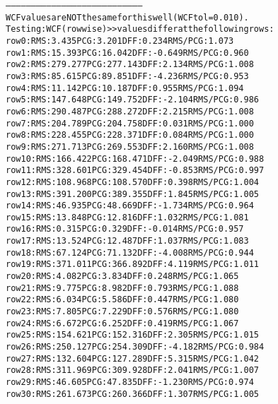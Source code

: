 \begin{alltt}
--------------------------------------------------------------------------------
WCF values are NOT the same for this well (WCF tol = 0.010).
Testing: WCF (rowwise) >> values differ at the following rows:
row   0:  RMS:   3.435    PCG:   3.201    DFF:   0.234    RMS/PCG:   1.073    
row   1:  RMS:  15.393    PCG:  16.042    DFF:  -0.649    RMS/PCG:   0.960    
row   2:  RMS: 279.277    PCG: 277.143    DFF:   2.134    RMS/PCG:   1.008    
row   3:  RMS:  85.615    PCG:  89.851    DFF:  -4.236    RMS/PCG:   0.953    
row   4:  RMS:  11.142    PCG:  10.187    DFF:   0.955    RMS/PCG:   1.094    
row   5:  RMS: 147.648    PCG: 149.752    DFF:  -2.104    RMS/PCG:   0.986    
row   6:  RMS: 290.487    PCG: 288.272    DFF:   2.215    RMS/PCG:   1.008    
row   7:  RMS: 204.789    PCG: 204.758    DFF:   0.031    RMS/PCG:   1.000    
row   8:  RMS: 228.455    PCG: 228.371    DFF:   0.084    RMS/PCG:   1.000    
row   9:  RMS: 271.713    PCG: 269.553    DFF:   2.160    RMS/PCG:   1.008    
row  10:  RMS: 166.422    PCG: 168.471    DFF:  -2.049    RMS/PCG:   0.988    
row  11:  RMS: 328.601    PCG: 329.454    DFF:  -0.853    RMS/PCG:   0.997    
row  12:  RMS: 108.968    PCG: 108.570    DFF:   0.398    RMS/PCG:   1.004    
row  13:  RMS: 391.200    PCG: 389.355    DFF:   1.845    RMS/PCG:   1.005    
row  14:  RMS:  46.935    PCG:  48.669    DFF:  -1.734    RMS/PCG:   0.964    
row  15:  RMS:  13.848    PCG:  12.816    DFF:   1.032    RMS/PCG:   1.081    
row  16:  RMS:   0.315    PCG:   0.329    DFF:  -0.014    RMS/PCG:   0.957    
row  17:  RMS:  13.524    PCG:  12.487    DFF:   1.037    RMS/PCG:   1.083    
row  18:  RMS:  67.124    PCG:  71.132    DFF:  -4.008    RMS/PCG:   0.944    
row  19:  RMS: 371.011    PCG: 366.892    DFF:   4.119    RMS/PCG:   1.011    
row  20:  RMS:   4.082    PCG:   3.834    DFF:   0.248    RMS/PCG:   1.065    
row  21:  RMS:   9.775    PCG:   8.982    DFF:   0.793    RMS/PCG:   1.088    
row  22:  RMS:   6.034    PCG:   5.586    DFF:   0.447    RMS/PCG:   1.080    
row  23:  RMS:   7.805    PCG:   7.229    DFF:   0.576    RMS/PCG:   1.080    
row  24:  RMS:   6.672    PCG:   6.252    DFF:   0.419    RMS/PCG:   1.067    
row  25:  RMS: 154.621    PCG: 152.316    DFF:   2.305    RMS/PCG:   1.015    
row  26:  RMS: 250.127    PCG: 254.309    DFF:  -4.182    RMS/PCG:   0.984    
row  27:  RMS: 132.604    PCG: 127.289    DFF:   5.315    RMS/PCG:   1.042    
row  28:  RMS: 311.969    PCG: 309.928    DFF:   2.041    RMS/PCG:   1.007    
row  29:  RMS:  46.605    PCG:  47.835    DFF:  -1.230    RMS/PCG:   0.974    
row  30:  RMS: 261.673    PCG: 260.366    DFF:   1.307    RMS/PCG:   1.005    

\end{alltt}
